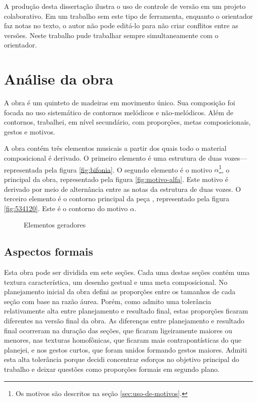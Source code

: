 A produção desta dissertação ilustra o uso de controle de versão em um
projeto colaborativo. Em um trabalho sem este tipo de ferramenta,
enquanto o orientador faz notas no texto, o autor não pode editá-lo
para não criar conflitos entre as versões. Neste trabalho pude
trabalhar sempre simultaneamente com o orientador.

\chapter{Análise da obra \obra{}}
\label{cha:anal-da-obra}

A obra \obra{} é um quinteto de madeiras em movimento único. Sua
composição foi focada no uso sistemático de contornos melódicos e
não-melódicos. Além de contornos, trabalhei, em nível secundário, com
proporções, metas composicionais, gestos e motivos.

A obra contém três elementos musicais a partir dos quais todo o
material composicional é derivado. O primeiro elemento é uma estrutura
de duas vozes---representada pela figura \ref{fig:bifonia}. O segundo
elemento é o motivo $\alpha$\footnote{Os motivos são descritos na
  seção \ref{sec:uso-de-motivos}.}, o principal da obra, representado
pela figura \ref{fig:motivo-alfa}. Este motivo é derivado por meio de
alternância entre as notas da estrutura de duas vozes. O terceiro
elemento é o contorno principal da peça \contpr{}, representado pela
figura \ref{fig:534120}. Este é o contorno do motivo $\alpha$.

\begin{figure}
  \centering

  \caption{Elementos geradores}
  \label{fig:elementos-geradores}
\end{figure}

\section{Aspectos formais}
\label{sec:aspectos-formais}

Esta obra pode ser dividida em sete seções. Cada uma destas seções
contém uma textura característica, um desenho gestual e uma meta
composicional. No planejamento inicial da obra defini as proporções
entre os tamanhos de cada seção com base na razão áurea. Porém, como
admito uma tolerância relativamente alta entre planejamento e
resultado final, estas proporções ficaram diferentes na versão final
da obra. As diferenças entre planejamento e resultado final ocorreram
na duração das seções, que ficaram ligeiramente maiores ou menores,
nas texturas homofônicas, que ficaram mais contrapontísticas do que
planejei, e nos gestos curtos, que foram unidos formando gestos
maiores. Admiti esta alta tolerância porque decidi concentrar esforços
no objetivo principal do trabalho e deixar questões como proporções
formais em segundo plano.

